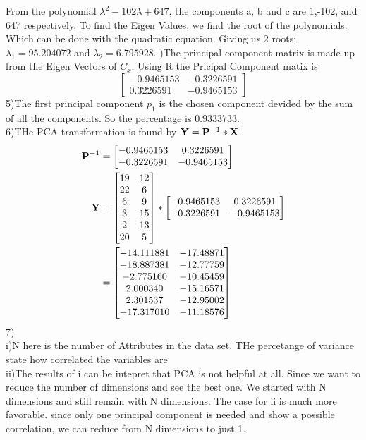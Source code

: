 \documentclass[12pt,english]{article}
\begin{document}
From the polynomial $\lambda^{2} -102\lambda + 647 $, the components a, b and c are 1,-102, and 647 respectively. To find the Eigen Values, we find the root of the polynomials. Which can be done with the quadratic equation. Giving us 2  roots; $\lambda_{1} = 95.204072$ and $\lambda_{2} = 6.795928$.
)The principal component matrix is made up from the Eigen Vectors of $C_{x}$. Using R  the Pricipal Component matix is
\begin{equation*}
\begin{bmatrix}-0.9465153 & -0.3226591 \\0.3226591 & -0.9465153
\end{bmatrix}
\end{equation*}
5)The first principal component $p_{1}$ is the chosen component devided by the sum of all the components. So the percentage is $0.9333733$.\\
6)THe PCA transformation is found by $\bold{Y} = \bold{P}^{-1} * \bold{X}$.
\begin{equation*}
\begin{split}
\bold{P}^{-1} &=\begin{bmatrix}-0.9465153 & 0.3226591 \\-0.3226591 & -0.9465153\end{bmatrix}\\
\bold{Y} &=\begin{bmatrix}19 & 12 \\22 &  6 \\ 6  &  9 \\ 3 &  15 \\ 2 &  13 \\20 &  5 \end{bmatrix}
 *
\begin{bmatrix}-0.9465153 & 0.3226591 \\-0.3226591 & -0.9465153\end{bmatrix}\\
&=\begin{bmatrix}-14.111881 &-17.48871 \\ -18.887381 &-12.77759 \\ -2.775160 &-10.45459 \\ 2.000340 &-15.16571 \\ 2.301537 & -12.95002 \\ -17.317010 &-11.18576 \end{bmatrix}
\end{split}
\end{equation*}
7)\\
i)N here is the number of Attributes in the data set. THe percetange of variance state how correlated the variables are\\
ii)The results of i can be intepret that PCA is not helpful at all. Since we want to reduce the number of dimensions and see the best one. We started with N dimensions and still remain with N dimensions. The case for ii is much more favorable. since only one principal component is needed and show a possible correlation, we can reduce from N dimensions to just 1.
\end{document}
